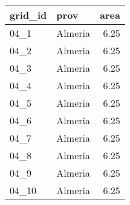 \begin{table}[ht]
\centering
\begin{tabular}{llr}
  \hline
grid\_id & prov & area \\ 
  \hline
04\_1 & Almeria & 6.25 \\ 
  04\_2 & Almeria & 6.25 \\ 
  04\_3 & Almeria & 6.25 \\ 
  04\_4 & Almeria & 6.25 \\ 
  04\_5 & Almeria & 6.25 \\ 
  04\_6 & Almeria & 6.25 \\ 
  04\_7 & Almeria & 6.25 \\ 
  04\_8 & Almeria & 6.25 \\ 
  04\_9 & Almeria & 6.25 \\ 
  04\_10 & Almeria & 6.25 \\ 
   \hline
\end{tabular}
\end{table}
